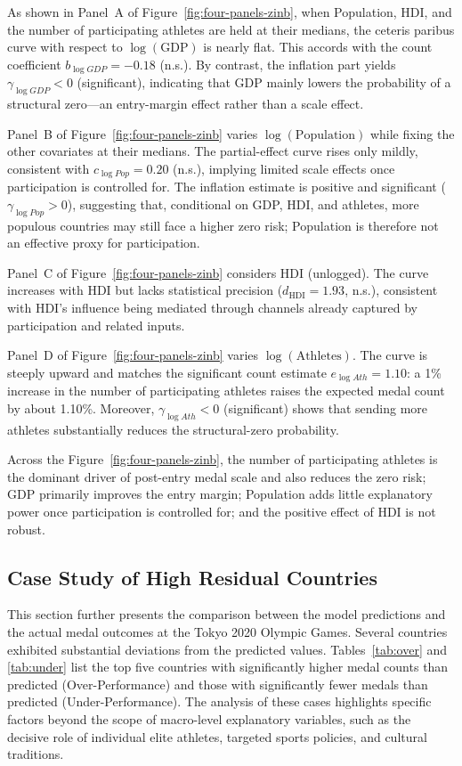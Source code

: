 \documentclass[11pt,twoside]{article}
\numberwithin{Theorem}{section}
\numberwithin{Definition}{section}
\numberwithin{Lemma}{section}
\numberwithin{Algorithm}{section}
\numberwithin{equation}{section}
\begin{document}
As shown in Panel~A of Figure~\ref{fig:four-panels-zinb}, when Population, HDI, and the number of participating athletes are held at their medians, the ceteris paribus curve with respect to $\log(\mathrm{GDP})$ is nearly flat. This accords with the count coefficient $b_{\log GDP}=-0.18$ (n.s.). By contrast, the inflation part yields $\gamma_{\log GDP}<0$ (significant), indicating that GDP mainly lowers the probability of a structural zero---an entry-margin effect rather than a scale effect.

Panel~B of Figure~\ref{fig:four-panels-zinb} varies $\log(\mathrm{Population})$ while fixing the other covariates at their medians. The partial-effect curve rises only mildly, consistent with $c_{\log Pop}=0.20$ (n.s.), implying limited scale effects once participation is controlled for. The inflation estimate is positive and significant ($\gamma_{\log Pop}>0$), suggesting that, conditional on GDP, HDI, and athletes, more populous countries may still face a higher zero risk; Population is therefore not an effective proxy for participation.

Panel~C of Figure~\ref{fig:four-panels-zinb} considers HDI (unlogged). The curve increases with HDI but lacks statistical precision ($d_{\mathrm{HDI}}=1.93$, n.s.), consistent with HDI’s influence being mediated through channels already captured by participation and related inputs.

Panel~D of Figure~\ref{fig:four-panels-zinb} varies $\log(\mathrm{Athletes})$. The curve is steeply upward and matches the significant count estimate $e_{\log Ath}=1.10$: a 1\% increase in the number of participating athletes raises the expected medal count by about 1.10\%. Moreover, $\gamma_{\log Ath}<0$ (significant) shows that sending more athletes substantially reduces the structural-zero probability.

Across the Figure~\ref{fig:four-panels-zinb}, the number of participating athletes is the dominant driver of post-entry medal scale and also reduces the zero risk; GDP primarily improves the entry margin; Population adds little explanatory power once participation is controlled for; and the positive effect of HDI is not robust.


\subsection{Case Study of High Residual Countries}

This section further presents the comparison between the model predictions and the actual medal outcomes at the Tokyo 2020 Olympic Games. Several countries exhibited substantial deviations from the predicted values. Tables~\ref{tab:over} and \ref{tab:under} list the top five countries with significantly higher medal counts than predicted (Over-Performance) and those with significantly fewer medals than predicted (Under-Performance). The analysis of these cases highlights specific factors beyond the scope of macro-level explanatory variables, such as the decisive role of individual elite athletes, targeted sports policies, and cultural traditions.
\end{document}
